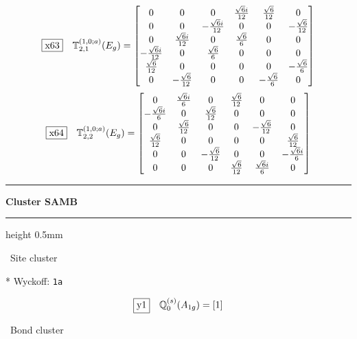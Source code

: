 \documentclass[fleqn,10pt,landscape]{jsarticle}
\begin{document}
\begin{dmath*}
\fbox{x63}\quad \mathbb{T}_{2,1}^{(1,0;a)}(E_{g})=\begin{bmatrix} 0 & 0 & 0 & \frac{\sqrt{6} i}{12} & \frac{\sqrt{6}}{12} & 0 \\ 0 & 0 & - \frac{\sqrt{6} i}{12} & 0 & 0 & - \frac{\sqrt{6}}{12} \\ 0 & \frac{\sqrt{6} i}{12} & 0 & \frac{\sqrt{6}}{6} & 0 & 0 \\ - \frac{\sqrt{6} i}{12} & 0 & \frac{\sqrt{6}}{6} & 0 & 0 & 0 \\ \frac{\sqrt{6}}{12} & 0 & 0 & 0 & 0 & - \frac{\sqrt{6}}{6} \\ 0 & - \frac{\sqrt{6}}{12} & 0 & 0 & - \frac{\sqrt{6}}{6} & 0 \end{bmatrix}
\end{dmath*}
\begin{dmath*}
\fbox{x64}\quad \mathbb{T}_{2,2}^{(1,0;a)}(E_{g})=\begin{bmatrix} 0 & \frac{\sqrt{6} i}{6} & 0 & \frac{\sqrt{6}}{12} & 0 & 0 \\ - \frac{\sqrt{6} i}{6} & 0 & \frac{\sqrt{6}}{12} & 0 & 0 & 0 \\ 0 & \frac{\sqrt{6}}{12} & 0 & 0 & - \frac{\sqrt{6}}{12} & 0 \\ \frac{\sqrt{6}}{12} & 0 & 0 & 0 & 0 & \frac{\sqrt{6}}{12} \\ 0 & 0 & - \frac{\sqrt{6}}{12} & 0 & 0 & - \frac{\sqrt{6} i}{6} \\ 0 & 0 & 0 & \frac{\sqrt{6}}{12} & \frac{\sqrt{6} i}{6} & 0 \end{bmatrix}
\end{dmath*}
\vspace{5mm}
\noindent \rule[0.5mm]{5mm}{0.5mm}\hspace{3mm}\textbf{Cluster SAMB}\hspace{3mm}\leaders\hrule height 0.5mm\hfill\kern0pt
\vspace{3mm}

\noindent\textbullet\, Site cluster

\vspace{5mm}

\noindent ** Wyckoff: \texttt{1a}

\begin{dmath*}
\fbox{y1}\quad \mathbb{Q}_{0}^{(s)}(A_{1g})=\left[ 1 \right]
\end{dmath*}
\vspace{5mm}

\noindent\textbullet\, Bond cluster
\end{document}
